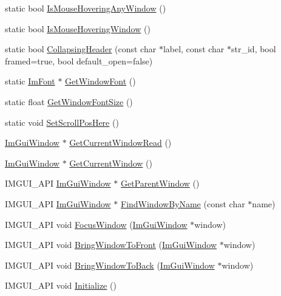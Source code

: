 \begin{DoxyCompactItemize}
static bool \hyperlink{namespace_im_gui_a183b8ebc12d5d90dacde5498043ccab9}{Is\+Mouse\+Hovering\+Any\+Window} ()
\item 
static bool \hyperlink{namespace_im_gui_a4ecd1146fdb6a12794bf742cb5c7c3fd}{Is\+Mouse\+Hovering\+Window} ()
\item 
static bool \hyperlink{namespace_im_gui_a9c09b5eb6ecddb39c6374f1323e88cf3}{Collapsing\+Header} (const char $\ast$label, const char $\ast$str\+\_\+id, bool framed=true, bool default\+\_\+open=false)
\item 
static \hyperlink{struct_im_font}{Im\+Font} $\ast$ \hyperlink{namespace_im_gui_a3d01834c8e79d6256b319d5c19e06c1c}{Get\+Window\+Font} ()
\item 
static float \hyperlink{namespace_im_gui_a71a2ce54252d4f142228e9cedb741a52}{Get\+Window\+Font\+Size} ()
\item 
static void \hyperlink{namespace_im_gui_a7cc7b1f2269550cfce93625243531ff3}{Set\+Scroll\+Pos\+Here} ()
\item 
\hyperlink{struct_im_gui_window}{Im\+Gui\+Window} $\ast$ \hyperlink{namespace_im_gui_a408f9ddac92f8629a7e273ced5f8c3aa}{Get\+Current\+Window\+Read} ()
\item 
\hyperlink{struct_im_gui_window}{Im\+Gui\+Window} $\ast$ \hyperlink{namespace_im_gui_a7ceba68eca2b09fb6bf1ad88037e6203}{Get\+Current\+Window} ()
\item 
I\+M\+G\+U\+I\+\_\+\+A\+PI \hyperlink{struct_im_gui_window}{Im\+Gui\+Window} $\ast$ \hyperlink{namespace_im_gui_afd2f3d9a23ef5cb331d060a0d77e2cde}{Get\+Parent\+Window} ()
\item 
I\+M\+G\+U\+I\+\_\+\+A\+PI \hyperlink{struct_im_gui_window}{Im\+Gui\+Window} $\ast$ \hyperlink{namespace_im_gui_abca25f22c02e73d5eb2e9c72c4557813}{Find\+Window\+By\+Name} (const char $\ast$name)
\item 
I\+M\+G\+U\+I\+\_\+\+A\+PI void \hyperlink{namespace_im_gui_ade4c08e7e7ad7bbfa4835248f5f3a7c6}{Focus\+Window} (\hyperlink{struct_im_gui_window}{Im\+Gui\+Window} $\ast$window)
\item 
I\+M\+G\+U\+I\+\_\+\+A\+PI void \hyperlink{namespace_im_gui_a5a4f4151114339422bfff1b2fffd022c}{Bring\+Window\+To\+Front} (\hyperlink{struct_im_gui_window}{Im\+Gui\+Window} $\ast$window)
\item 
I\+M\+G\+U\+I\+\_\+\+A\+PI void \hyperlink{namespace_im_gui_aa4205bd07b25655ed023f47b52572273}{Bring\+Window\+To\+Back} (\hyperlink{struct_im_gui_window}{Im\+Gui\+Window} $\ast$window)
\item 
I\+M\+G\+U\+I\+\_\+\+A\+PI void \hyperlink{namespace_im_gui_a1a611da38fae18a3d1dafcb3228259da}{Initialize} ()

\end{DoxyCompactItemize}

